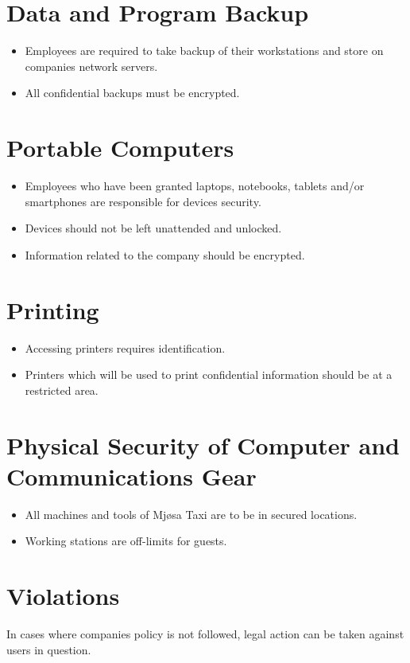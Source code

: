 \section{Data and Program Backup}

    \begin{itemize}[noitemsep]
        \item Employees are required to take backup of their workstations and store on companies network servers.
        \item All confidential backups must be encrypted.

    \end{itemize}
    

\section{Portable Computers}

    \begin{itemize}[noitemsep]
        \item Employees who have been granted laptops, notebooks, tablets and/or smartphones are responsible for devices security.
        \item Devices should not be left unattended and unlocked.
        \item Information related to the company should be encrypted.

    \end{itemize}{}
    

\section{Printing}

    \begin{itemize}[noitemsep]
        \item Accessing printers requires identification.
        \item Printers which will be used to print confidential information should be at a restricted area.
    \end{itemize}{}
    

\section{Physical Security of Computer and Communications Gear}

    \begin{itemize}[noitemsep]
        \item All machines and tools of Mjøsa Taxi are to be in secured locations.
        \item Working stations are off-limits for guests.

    \end{itemize}{}
    

\section{Violations}
In cases where companies policy is not followed, legal action can be taken against users in question.